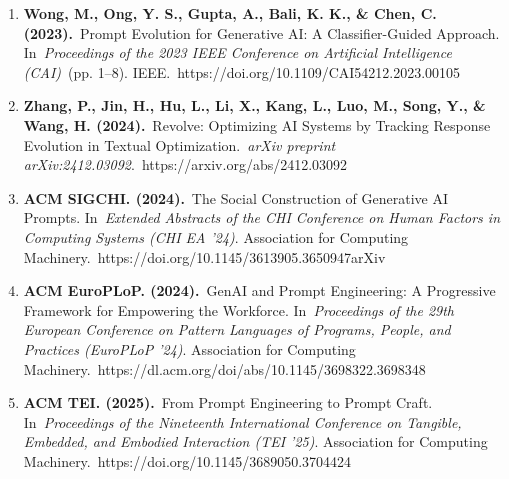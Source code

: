 \documentclass[10pt,a4paper,twocolumn]{article}
\begin{document}
\begin{enumerate}
   \item 
\textbf{Wong, M., Ong, Y. S., Gupta, A., Bali, K. K., \& Chen, C. (2023).} Prompt Evolution for Generative AI: A Classifier-Guided Approach. In \textit{Proceedings of the 2023 IEEE Conference on Artificial Intelligence (CAI)} (pp. 1–8). IEEE. https://doi.org/10.1109/CAI54212.2023.00105

  \item 
\textbf{Zhang, P., Jin, H., Hu, L., Li, X., Kang, L., Luo, M., Song, Y., \& Wang, H. (2024).} Revolve: Optimizing AI Systems by Tracking Response Evolution in Textual Optimization. \textit{arXiv preprint arXiv:2412.03092}. https://arxiv.org/abs/2412.03092

   \item 
\textbf{ACM SIGCHI. (2024).} The Social Construction of Generative AI Prompts. In \textit{Extended Abstracts of the CHI Conference on Human Factors in Computing Systems (CHI EA '24)}. Association for Computing Machinery. https://doi.org/10.1145/3613905.3650947arXiv

  \item 
\textbf{ACM EuroPLoP. (2024).} GenAI and Prompt Engineering: A Progressive Framework for Empowering the Workforce. In \textit{Proceedings of the 29th European Conference on Pattern Languages of Programs, People, and Practices (EuroPLoP '24)}. Association for Computing Machinery. https://dl.acm.org/doi/abs/10.1145/3698322.3698348

  \item 
\textbf{ACM TEI. (2025).} From Prompt Engineering to Prompt Craft. In \textit{Proceedings of the Nineteenth International Conference on Tangible, Embedded, and Embodied Interaction (TEI '25)}. Association for Computing Machinery. https://doi.org/10.1145/3689050.3704424



 

\end{enumerate}
\end{document}
